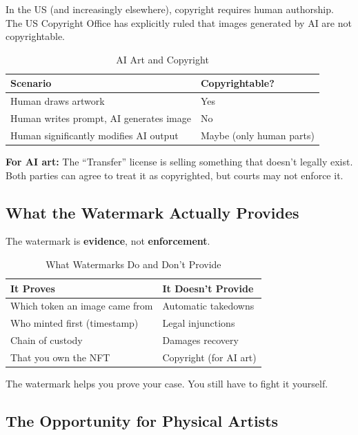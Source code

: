 \documentclass[11pt,a4paper]{article}
\begin{document}
In the US (and increasingly elsewhere), copyright requires human authorship. The US Copyright Office has explicitly ruled that images generated by AI are not copyrightable.

\begin{table}[h]
\centering
\begin{tabular}{@{}L{8cm}l@{}}
\toprule
\textbf{Scenario} & \textbf{Copyrightable?} \\
\midrule
Human draws artwork & Yes \\
Human writes prompt, AI generates image & No \\
Human significantly modifies AI output & Maybe (only human parts) \\
\bottomrule
\end{tabular}
\caption{AI Art and Copyright}
\end{table}

\textbf{For AI art:} The ``Transfer'' license is selling something that doesn't legally exist. Both parties can agree to treat it as copyrighted, but courts may not enforce it.

\subsection{What the Watermark Actually Provides}

The watermark is \textbf{evidence}, not \textbf{enforcement}.

\begin{table}[h]
\centering
\begin{tabular}{@{}L{6cm}L{6cm}@{}}
\toprule
\textbf{It Proves} & \textbf{It Doesn't Provide} \\
\midrule
Which token an image came from & Automatic takedowns \\
Who minted first (timestamp) & Legal injunctions \\
Chain of custody & Damages recovery \\
That you own the NFT & Copyright (for AI art) \\
\bottomrule
\end{tabular}
\caption{What Watermarks Do and Don't Provide}
\end{table}

The watermark helps you prove your case. You still have to fight it yourself.

\subsection{The Opportunity for Physical Artists}
\end{document}
